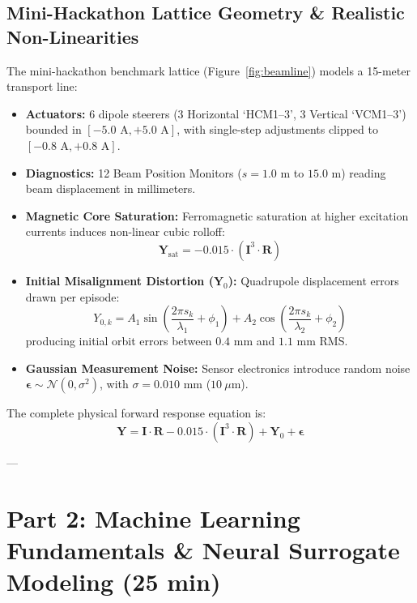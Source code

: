 \documentclass[11pt,a4paper]{article}
\begin{document}
\subsection{Mini-Hackathon Lattice Geometry \& Realistic Non-Linearities}
The mini-hackathon benchmark lattice (Figure~\ref{fig:beamline}) models a 15-meter transport line:
\begin{itemize}
    \item \textbf{Actuators:} 6 dipole steerers (3 Horizontal `HCM1--3', 3 Vertical `VCM1--3') bounded in $[-5.0\text{ A}, +5.0\text{ A}]$, with single-step adjustments clipped to $[-0.8\text{ A}, +0.8\text{ A}]$.
    \item \textbf{Diagnostics:} 12 Beam Position Monitors ($s = 1.0\text{ m}$ to $15.0\text{ m}$) reading beam displacement in millimeters.
    \item \textbf{Magnetic Core Saturation:} Ferromagnetic saturation at higher excitation currents induces non-linear cubic rolloff:
    \begin{equation}
        \mathbf{Y}_{\text{sat}} = - 0.015 \cdot (\mathbf{I}^3 \cdot \mathbf{R})
    \end{equation}
    \item \textbf{Initial Misalignment Distortion ($\mathbf{Y}_0$):} Quadrupole displacement errors drawn per episode:
    \begin{equation}
        Y_{0, k} = A_1 \sin\left(\frac{2\pi s_k}{\lambda_1} + \phi_1\right) + A_2 \cos\left(\frac{2\pi s_k}{\lambda_2} + \phi_2\right)
    \end{equation}
    producing initial orbit errors between $0.4\text{ mm}$ and $1.1\text{ mm}$ RMS.
    \item \textbf{Gaussian Measurement Noise:} Sensor electronics introduce random noise $\boldsymbol{\epsilon} \sim \mathcal{N}(0, \sigma^2)$, with $\sigma = 0.010\text{ mm}$ ($10\ \mu\text{m}$).
\end{itemize}

The complete physical forward response equation is:
\begin{equation}
    \mathbf{Y} = \mathbf{I} \cdot \mathbf{R} - 0.015 \cdot (\mathbf{I}^3 \cdot \mathbf{R}) + \mathbf{Y}_0 + \boldsymbol{\epsilon}
\end{equation}

---

\section{Part 2: Machine Learning Fundamentals \& Neural Surrogate Modeling (25 min)}
\end{document}
